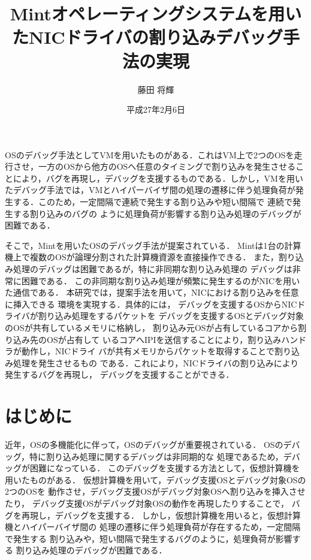 \documentclass[tanilab-enum]{graduate}
\title{Mintオペレーティングシステムを用いたNICドライバの割り込みデバッグ手法の実現}
\author{藤田 将輝}
\date{平成27年2月6日}
\begin{document}
\maketitle

  OSのデバッグ手法としてVMを用いたものがある．これはVM上で2つのOSを走
行させ，一方のOSから他方のOSへ任意のタイミングで割り込みを発生させるこ
とにより，バグを再現し，デバッグを支援するものである．しかし，VMを用い
たデバッグ手法では，VMとハイパーバイザ間の処理の遷移に伴う処理負荷が発
生する．このため，一定間隔で連続で発生する割り込みや短い間隔で
連続で発生する割り込みのバグの
ように処理負荷が影響する割り込み処理のデバッグが困難である．

そこで，Mintを用いたOSのデバッグ手法が提案されている．
Mintは1台の計算機上で複数のOSが論理分割された計算機資源を直接操作できる．
また，割り込み処理のデバッグは困難であるが，特に非同期な割り込み処理の
デバッグは非常に困難である．
この非同期な割り込み処理が頻繁に発生するのがNICを用いた通信である．
本研究では，提案手法を用いて，NICにおける割り込みを任意に挿入できる
環境を実現する．具体的には，
デバッグを支援するOSからNICドライバが割り込み処理をするパケットを
デバッグを支援するOSとデバッグ対象のOSが共有しているメモリに格納し，
割り込み元OSが占有しているコアから割り込み先のOSが占有して
いるコアへIPIを送信することにより，割り込みハンドラが動作し，NICドライ
バが共有メモリからパケットを取得することで割り込み処理を発生させるもの
である．これにより，NICドライバの割り込みにより発生するバグを再現し，
デバッグを支援することができる．


\tableandlists%

\chapter{はじめに}\label{chap:introduction}
近年，OSの多機能化に伴って，OSのデバッグが重要視されている．
OSのデバッグ，特に割り込み処理に関するデバッグは非同期的な
処理であるため，デバッグが困難になっている．
このデバッグを支援する方法として，仮想計算機を用いたものがある．
仮想計算機を用いて，デバッグ支援OSとデバッグ対象OSの2つのOSを
動作させ，デバッグ支援OSがデバッグ対象OSへ割り込みを挿入させたり，
デバッグ支援OSがデバッグ対象OSの動作を再現したりすることで，
バグを再現し，デバッグを支援する．
しかし，仮想計算機を用いると，仮想計算機とハイパーバイザ間の
処理の遷移に伴う処理負荷が存在するため，一定間隔で発生する
割り込みや，短い間隔で発生するバグのように，処理負荷が影響する
割り込み処理のデバッグが困難である．
\end{document}
